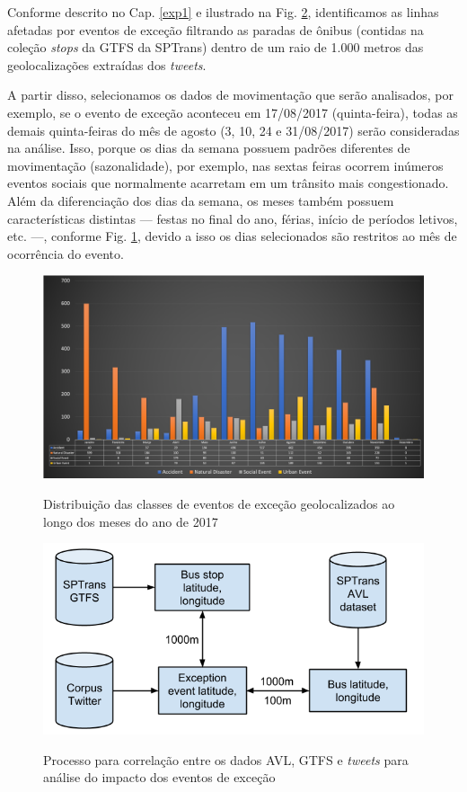 \documentclass[
	12pt,				%
	oneside,			%
	a4paper,			%
	english,			%
	brazil				%
	]{abntex2ppgsi}
\begin{document}
Conforme descrito no Cap. \ref{exp1} e ilustrado na Fig. \ref{fig:avl_tweets_correlation}, identificamos as linhas afetadas por eventos de exceção filtrando as paradas de ônibus (contidas na coleção \textit{stops} da GTFS da SPTrans) dentro de um raio de 1.000 metros das geolocalizações extraídas dos \textit{tweets}. 

A partir disso, selecionamos os dados de movimentação que serão analisados, por exemplo, se o evento de exceção aconteceu em 17/08/2017 (quinta-feira), todas as demais quinta-feiras do mês de agosto (3, 10, 24 e 31/08/2017) serão consideradas na análise. Isso, porque os dias da semana possuem padrões diferentes de movimentação (sazonalidade), por exemplo, nas sextas feiras ocorrem inúmeros eventos sociais que normalmente acarretam em um trânsito mais congestionado. Além da diferenciação dos dias da semana, os meses também possuem características distintas --- festas no final do ano, férias, início de períodos letivos, etc. ---, conforme Fig. \ref{fig:exception_events_classification_distribution}, devido a isso os dias selecionados são restritos ao mês de ocorrência do evento.

\begin{figure}[!htb]
	\centering
 	  \caption{Distribuição das classes de eventos de exceção geolocalizados ao longo dos meses do ano de 2017}
		\includegraphics[width=1\linewidth]{images/exception_events_classification_distribution.png}
	\label{fig:exception_events_classification_distribution}
\end{figure}

\begin{figure}[!htb]
	\centering
 	  \caption{Processo para correlação entre os dados AVL, GTFS e \textit{tweets} para análise do impacto dos eventos de exceção}
		\includegraphics[width=0.7\linewidth]{images/avl_tweets_correlation.png}
	\label{fig:avl_tweets_correlation}
\end{figure}
\end{document}
